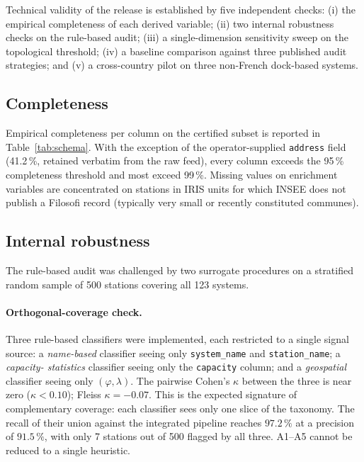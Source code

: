 \documentclass[11pt,a4paper]{article}
\begin{document}
Technical validity of the release is established by five independent
checks: (i) the empirical completeness of each derived variable;
(ii) two internal robustness checks on the rule-based audit;
(iii) a single-dimension sensitivity sweep on the topological
threshold; (iv) a baseline comparison against three published audit
strategies; and (v) a cross-country pilot on three non-French dock-based
systems.

\subsection{Completeness}
Empirical completeness per column on the certified subset is reported
in Table~\ref{tab:schema}. With the exception of the operator-supplied
\texttt{address} field (41.2\,\%, retained verbatim from the raw
feed), every column exceeds the 95\,\% completeness threshold and
most exceed 99\,\%. Missing values on enrichment variables are
concentrated on stations in IRIS units for which INSEE does not
publish a Filosofi record (typically very small or recently
constituted communes).

\subsection{Internal robustness}
The rule-based audit was challenged by two surrogate procedures on a
stratified random sample of 500 stations covering all 123 systems.

\paragraph{Orthogonal-coverage check.}
Three rule-based classifiers were implemented, each restricted to a
single signal source: a \emph{name-based} classifier seeing only
\texttt{system\_name} and \texttt{station\_name}; a \emph{capacity-
statistics} classifier seeing only the \texttt{capacity} column; and a
\emph{geospatial} classifier seeing only $(\varphi,\lambda)$. The
pairwise Cohen's $\kappa$ between the three is near zero
($\kappa < 0.10$); Fleiss $\kappa = -0.07$. This is the expected
signature of complementary coverage: each classifier sees only one
slice of the taxonomy. The recall of their union against the
integrated pipeline reaches $97.2\,\%$ at a precision of $91.5\,\%$,
with only 7 stations out of 500 flagged by all three. A1--A5 cannot
be reduced to a single heuristic.
\end{document}
